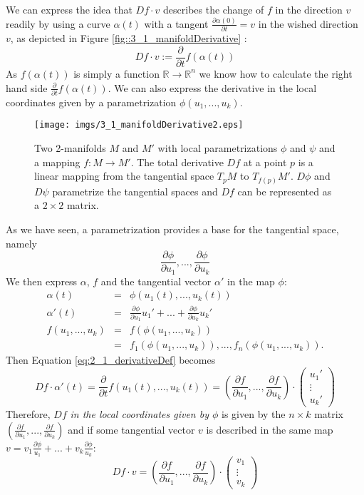 We can express the idea that $Df\cdot v$ describes the change of $f$ in the direction $v$ readily by using a curve $\alpha (t)$ with a tangent $\frac{\partial \alpha(0)}{\partial t} = v$ in the wished direction $v$, as depicted in Figure \ref{fig::3_1_manifoldDerivative} :
\begin{equation} Df \cdot v := \frac{\partial}{\partial t} f(\alpha(t)) \label{eq:2_1_derivativeDef}\end{equation}
As $f(\alpha(t))$ is simply a function $\mathbb R \rightarrow \mathbb R^n$ we know how to calculate the right hand side $\frac{\partial}{\partial t} f(\alpha(t))$. We can also express the derivative in the local coordinates given by a parametrization $\phi(u_1,...,u_k)$.


\begin{figure}
\begin{center}
\texttt{[image: imgs/3\_1\_manifoldDerivative2.eps]}
\end{center}
\caption{Two 2-manifolds $M$ and $M'$ with local parametrizations $\phi$ and $\psi$ and a mapping $f: M \rightarrow M'$. The total derivative $Df$ at a point $p$ is a linear mapping from the tangential space $T_p M$ to $T_{f(p)} M'$. $D\phi$ and $D \psi$ parametrize the tangential spaces and $Df$ can be represented as a $2\times 2$ matrix.}
\label{fig::3_1_manifoldDerivative2}
\end{figure}


As we have seen, a parametrization provides a base for the tangential space, namely 
\[\frac{\partial\phi}{\partial u_1},..., \frac{\partial\phi}{\partial u_k}\] 
We then express $\alpha$, $f$ and the tangential vector $\alpha'$ in the map $\phi$:
\begin{eqnarray*} \alpha(t) &=& \phi(u_1(t),...,u_k(t))\\
\alpha'(t) &=& \frac{\partial\phi}{\partial u_1} u_1' + ... + \frac{\partial\phi}{\partial u_k} u_k'\\
 f(u_1,...,u_k) &=& f(\phi(u_1,...,u_k)) \\
 &=& f_1(\phi(u_1,...,u_k)),...,f_n(\phi(u_1,...,u_k)). \end{eqnarray*} 
Then Equation \ref{eq:2_1_derivativeDef} becomes
\[Df \cdot \alpha'(t) = \frac{\partial}{\partial t}f(u_1(t),...,u_k(t)) = (\frac{\partial f}{\partial u_1},..., \frac{\partial f}{\partial u_k}) \cdot \begin{pmatrix}
	u_1' \\ \vdots \\ u_k'\end{pmatrix}\]
Therefore, $Df$ \emph{in the local coordinates given by $\phi$} is given by the $ n \times k$ matrix $(\frac{\partial f}{\partial u_1},..., \frac{\partial f}{\partial u_k})$ and if some tangential vector $v$ is described in the same map $v = v_1 \frac{\partial \phi}{u_1} +...+ v_k \frac{\partial \phi}{u_k}$:
\[Df \cdot v = (\frac{\partial f}{\partial u_1},..., \frac{\partial f}{\partial u_k}) \cdot \begin{pmatrix}
	v_1 \\ \vdots \\ v_k\end{pmatrix}\]



